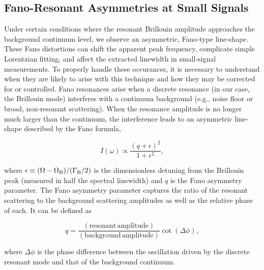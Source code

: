 \subsection{Fano-Resonant Asymmetries at Small Signals}
\label{Results:Fano-Resonant Asymmetries at Small Signals}

Under certain conditions where the resonant Brillouin amplitude approaches the background continuum level, we observe an asymmetric, Fano‐type line-shape. \cite{fano1961effects, limonov2017fano, limonov2021fano, kroner2008nonlinear} These Fano distortions can shift the apparent peak frequency, complicate simple Lorentzian fitting, and affect the extracted linewidth in small‐signal measurements. \cite{miroshnichenko2010fano} To properly handle these occurances, it is necessary to understand when they are likely to arise with this technique and how they may be corrected for or controlled. Fano resonances arise when a discrete resonance (in our case, the Brillouin mode) interferes with a continuum background (e.g., noise floor or broad, non‐resonant scattering). When the resonance amplitude is no longer much larger than the continuum, the interference leads to an asymmetric line-shape described by the Fano formula, \cite{fano1961effects}

\begin{equation}
I(\omega) \propto \frac{(q + \epsilon)^2}{1 + \epsilon^2},
\label{eq:fano}
\end{equation}

where \(\epsilon \equiv (\Omega - \Omega_{\rm B})/(\Gamma_{\rm B}/2)\) is the dimensionless detuning from the Brillouin peak (measured in half the spectral linewidth) and \(q\) is the Fano asymmetry parameter. The Fano asymmetry parameter captures the ratio of the resonant scattering to the background scattering amplitudes as well as the relative phase of each. It can be defined as

\begin{equation}
  q = \frac{(\mathrm{resonant\,amplitude})}{(\mathrm{background\,amplitude})}\cot{(\Delta\phi)},
\end{equation}

where \(\Delta\phi\) is the phase difference between the oscillation driven by the discrete resonant mode and that of the background continuum. \cite{limonov2017fano, ko2023full, gu2020fano}

